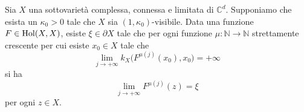 \begin{prop} \label{inf_impl_ugu}
    Sia $X$ una sottovarietà complessa, connessa e limitata di $\mathbb{C}^d$. Supponiamo che esista un $\kappa_0>0$ tale che $X$ sia $(1,\kappa_0)$-visibile. Data una funzione $F\in\textnormal{Hol}(X,X)$, esiste $\xi\in\partial X$ tale che per ogni funzione $\mu:\mathbb{N}\longrightarrow\mathbb{N}$ strettamente crescente per cui esiste $x_0 \in X$ tale che
    \begin{equation}
        \lim_{j\longrightarrow+\infty} k_X\big(F^{\mu(j)}(x_0),x_0\big)=+\infty
    \end{equation}
    si ha
    \begin{equation}
        \lim_{j\longrightarrow+\infty} F^{\mu(j)}(z)=\xi
    \end{equation}
    per ogni $z \in X$.
\end{prop}

